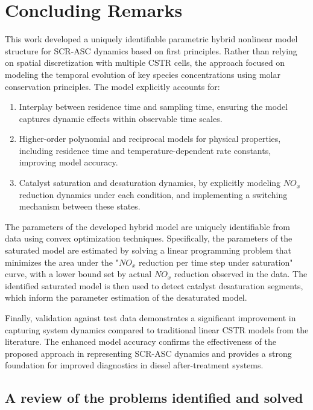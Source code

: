 \newpage
\section{Concluding Remarks}
This work developed a uniquely identifiable parametric hybrid nonlinear model structure for SCR-ASC dynamics based on
first principles. Rather than relying on spatial discretization with multiple CSTR cells, the approach focused on modeling the temporal evolution of key species concentrations using molar conservation principles. The model explicitly accounts for:

\begin{enumerate}
        \item Interplay between residence time and sampling time, ensuring the model captures dynamic effects within observable time scales.
        \item Higher-order polynomial and reciprocal models for physical properties, including residence time and temperature-dependent rate constants, improving model accuracy.
        \item Catalyst saturation and desaturation dynamics, by explicitly modeling $NO_x$ reduction dynamics under each condition, and implementing a switching mechanism between these states.
\end{enumerate}

The parameters of the developed hybrid model are uniquely identifiable from data using convex optimization techniques.
Specifically, the parameters of the saturated model are estimated by solving a linear programming problem that minimizes
the area under the "$NO_x$ reduction per time step under saturation" curve, with a lower bound set by actual $NO_x$
reduction observed in the data. The identified saturated model is then used to detect catalyst desaturation segments,
which inform the parameter estimation of the desaturated model.

Finally, validation against test data demonstrates a significant improvement in capturing system dynamics compared to
traditional linear CSTR models from the literature. The enhanced model accuracy confirms the effectiveness of the
proposed approach in representing SCR-ASC dynamics and provides a strong foundation for improved diagnostics in diesel
after-treatment systems.


\subsection{A review of the problems identified and solved}

